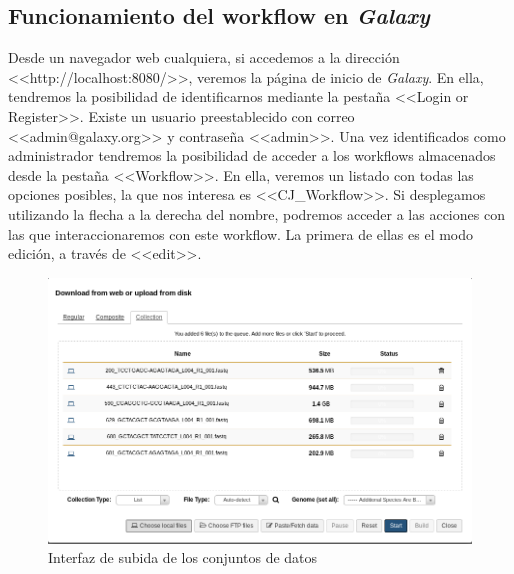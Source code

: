 \subsection{Funcionamiento del workflow en \textit{Galaxy}}
Desde un navegador web cualquiera, si accedemos a la dirección <<http://localhost:8080/>>, veremos la página de inicio de \textit{Galaxy}. En ella, tendremos la posibilidad de identificarnos mediante la pestaña <<Login or Register>>. Existe un usuario preestablecido con correo <<admin@galaxy.org>> y contraseña <<admin>>. Una vez identificados como administrador tendremos la posibilidad de acceder a los workflows almacenados desde la pestaña <<Workflow>>. En ella, veremos un listado con todas las opciones posibles, la que nos interesa es <<CJ\_Workflow>>. Si desplegamos utilizando la flecha a la derecha del nombre, podremos acceder a las acciones con las que interaccionaremos con este workflow. La primera de ellas es el modo edición, a través de <<edit>>. 

\begin{figure}
    \begin{center}
      \includegraphics[scale=0.55]{images/SubidaDatasets.png}
      \caption{Interfaz de subida de los conjuntos de datos}
      \label{fig:SubidaDatasets}
    \end{center}
\end{figure}

